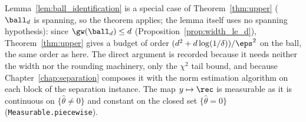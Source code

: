\begin{remark}
Lemma~\ref{lem:ball_identification} is a special case of Theorem~\ref{thm:upper} ($\ball_d$ is
spanning, so the theorem applies; the lemma itself uses no spanning hypothesis): since
$\gw(\ball_d) \le d$ (Proposition~\ref{prop:width_le_d}), Theorem~\ref{thm:upper} gives a budget of
order $(d^2 + d\log(1/\delta))/\eps^2$ on the ball, the same order as here. The direct argument is
recorded because it needs neither the width nor the rounding machinery, only the
$\chi^2$ tail bound, and because Chapter~\ref{chap:separation} composes it with the norm
estimation algorithm on each block of the separation instance. The map $y \mapsto \rec$ is
measurable as it is continuous on $\{\hat\theta \ne 0\}$ and constant on the closed set
$\{\hat\theta = 0\}$ (\texttt{Measurable.piecewise}).
\end{remark}
